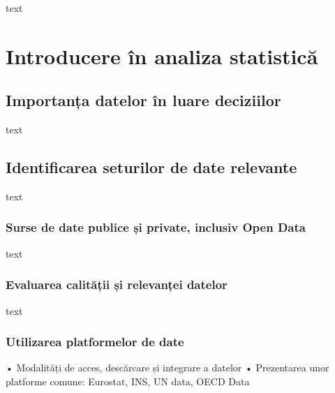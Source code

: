 \documentclass[
  11pt,
  b5paper,
  nottoc]{book}
\begin{document}
text


\hypertarget{cap2}{%
\chapter{Introducere în analiza statistică}\label{cap2}}

\hypertarget{importanux21ba-datelor-uxeen-luare-deciziilor-1}{%
\section{Importanța datelor în luare
deciziilor}\label{importanux21ba-datelor-uxeen-luare-deciziilor-1}}

text

\hypertarget{identificarea-seturilor-de-date-relevante-1}{%
\section{Identificarea seturilor de date
relevante}\label{identificarea-seturilor-de-date-relevante-1}}

text

\hypertarget{surse-de-date-publice-ux219i-private-inclusiv-open-data-1}{%
\subsection{Surse de date publice și private, inclusiv Open
Data}\label{surse-de-date-publice-ux219i-private-inclusiv-open-data-1}}

text

\hypertarget{evaluarea-calitux103ux21bii-ux219i-relevanux21bei-datelor-1}{%
\subsection{Evaluarea calității și relevanței
datelor}\label{evaluarea-calitux103ux21bii-ux219i-relevanux21bei-datelor-1}}

text

\hypertarget{utilizarea-platformelor-de-date-1}{%
\subsection{Utilizarea platformelor de
date}\label{utilizarea-platformelor-de-date-1}}

• Modalități de acces, descărcare și integrare a datelor • Prezentarea
unor platforme comune: Eurostat, INS, UN data, OECD Data
\end{document}
